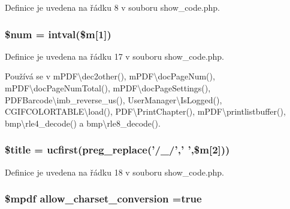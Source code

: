 Definice je uvedena na řádku 8 v souboru show\-\_\-code.\-php.

\hypertarget{show__code_8php_a606c9dff2aade84f01338c3c4cd8016b}{
\subsubsection[{\$num}]{\setlength{\rightskip}{0pt plus 5cm}\$num = intval(\$m\mbox{[}1\mbox{]})}}\label{show__code_8php_a606c9dff2aade84f01338c3c4cd8016b}


Definice je uvedena na řádku 17 v souboru show\-\_\-code.\-php.



Používá se v m\-P\-D\-F\textbackslash{}dec2other(), m\-P\-D\-F\textbackslash{}doc\-Page\-Num(), m\-P\-D\-F\textbackslash{}doc\-Page\-Num\-Total(), m\-P\-D\-F\textbackslash{}doc\-Page\-Settings(), P\-D\-F\-Barcode\textbackslash{}imb\-\_\-reverse\-\_\-us(), User\-Manager\textbackslash{}\-Is\-Logged(), C\-G\-I\-F\-C\-O\-L\-O\-R\-T\-A\-B\-L\-E\textbackslash{}load(), P\-D\-F\textbackslash{}\-Print\-Chapter(), m\-P\-D\-F\textbackslash{}printlistbuffer(), bmp\textbackslash{}rle4\-\_\-decode() a bmp\textbackslash{}rle8\-\_\-decode().

\hypertarget{show__code_8php_ada57e7bb7c152edad18fe2f166188691}{
\subsubsection[{\$title}]{\setlength{\rightskip}{0pt plus 5cm}\$title = ucfirst(preg\-\_\-replace('/\-\_\-/',' ',\$m\mbox{[}2\mbox{]}))}}\label{show__code_8php_ada57e7bb7c152edad18fe2f166188691}


Definice je uvedena na řádku 18 v souboru show\-\_\-code.\-php.

\hypertarget{show__code_8php_abef25a78e171b6e37513665f692d1960}{
\subsubsection[{allow\-\_\-charset\-\_\-conversion}]{\setlength{\rightskip}{0pt plus 5cm}\$mpdf allow\-\_\-charset\-\_\-conversion =true}}\label{show__code_8php_abef25a78e171b6e37513665f692d1960}


